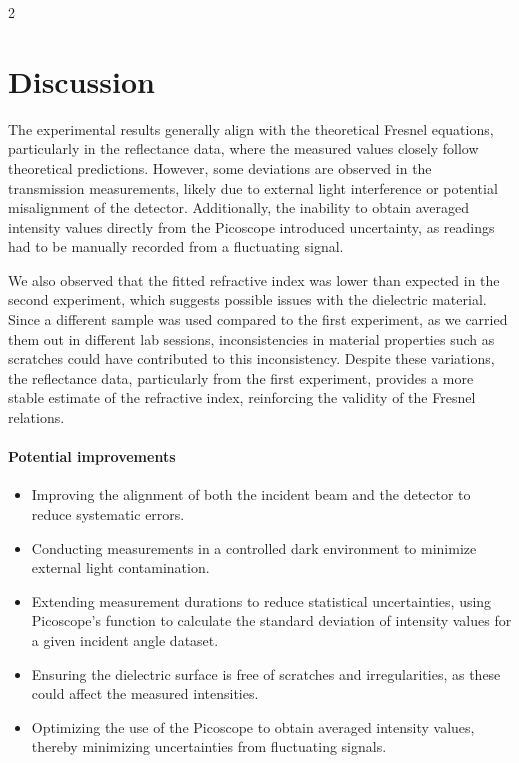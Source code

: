 \documentclass[a4paper,oneside,article]{memoir}
\begin{document}
\begin{multicols}{2}

\chapter{Discussion}\label{sec:dis}
The experimental results generally align with the theoretical Fresnel equations, particularly in the reflectance data, where the measured values closely follow theoretical predictions. However, some deviations are observed in the transmission measurements, likely due to external light interference or potential misalignment of the detector. Additionally, the inability to obtain averaged intensity values directly from the Picoscope introduced uncertainty, as readings had to be manually recorded from a fluctuating signal.

We also observed that the fitted refractive index was lower than expected in the second experiment, which suggests possible issues with the dielectric material. Since a different sample was used compared to the first experiment, as we carried them out in different lab sessions, inconsistencies in material properties such as scratches could have contributed to this inconsistency. Despite these variations, the reflectance data, particularly from the first experiment, provides a more stable estimate of the refractive index, reinforcing the validity of the Fresnel relations.

\subsubsection{Potential improvements}
\begin{itemize} \item Improving the alignment of both the incident beam and the detector to reduce systematic errors. \item Conducting measurements in a controlled dark environment to minimize external light contamination. \item Extending measurement durations to reduce statistical uncertainties, using  Picoscope's function to calculate the standard deviation of intensity values for a given incident angle dataset. \item Ensuring the dielectric surface is free of scratches and irregularities, as these could affect the measured intensities. \item Optimizing the use of the Picoscope to obtain averaged intensity values, thereby minimizing uncertainties from fluctuating signals. \end{itemize}


\end{multicols}
\end{document}
